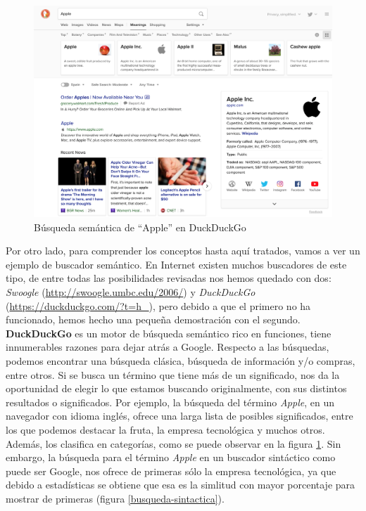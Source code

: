 \begin{figure}[H]
	\centering
	\includegraphics[height=9.cm]{imagenes/capitulo3/duck21}
	\caption{Búsqueda semántica de ``Apple'' en DuckDuckGo}
	\label{busqueda-semantica}
\end{figure}



Por otro lado, para comprender los conceptos hasta aquí tratados, vamos a ver un ejemplo de buscador semántico. En Internet existen muchos buscadores de este tipo, de entre todas las posibilidades revisadas \cite{buscadores-semanticos} nos hemos quedado con dos: \textit{Swoogle} (\url{http://swoogle.umbc.edu/2006/}) y \textit{DuckDuckGo} (\url{https://duckduckgo.com/?t=h_}), pero debido a que el primero no ha funcionado, hemos hecho una pequeña demostración con el segundo. \textbf{DuckDuckGo} es un motor de búsqueda semántico rico en funciones, tiene innumerables razones para dejar atrás a Google. Respecto a las búsquedas, podemos encontrar una búsqueda clásica, búsqueda de información y/o compras, entre otros. Si se busca un término que tiene más de un significado, nos da la oportunidad de elegir lo que estamos buscando originalmente, con sus distintos resultados o significados. Por ejemplo, la búsqueda del término \textit{Apple}, en un navegador con idioma inglés, ofrece una larga lista de posibles significados, entre los que podemos destacar la fruta, la empresa tecnológica y muchos otros. Además, los clasifica en categorías, como se puede observar en la figura \ref{busqueda-semantica}. Sin embargo, la búsqueda para el término \textit{Apple} en un buscador sintáctico como puede ser Google, nos ofrece de primeras sólo la empresa tecnológica, ya que debido a estadísticas se obtiene que esa es la simlitud con mayor porcentaje para mostrar de primeras (figura \ref{busqueda-sintactica}).

